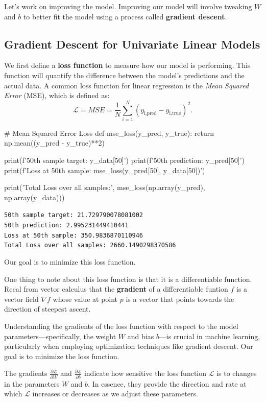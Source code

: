 Let's work on improving the model. Improving our model will involve tweaking $W$ and $b$ to better fit the model using a process called \textbf{gradient descent}.

\subsection{Gradient Descent for Univariate Linear Models}
\label{subsec:2}
We first define a \textbf{loss function} to measure how our model is performing. This function will quantify the difference between the model's predictions and the actual data. A common loss function for linear regression is the \textit{Mean Squared Error} (MSE), which is defined as:
$$\mathcal{L} = MSE = \frac{1}{N}\sum_{i=1}^N\left(y_\text{i,pred} - y_\text{i,true}\right)^2.$$

\begin{codeblock}

# Mean Squared Error Loss
def mse_loss(y_pred, y_true):
    return np.mean((y_pred - y_true)**2)

print(f'50th sample target: {y_data[50]}')
print(f'50th prediction: {y_pred[50]}')
print(f'Loss at 50th sample: {mse_loss(y_pred[50], y_data[50])}')

print('Total Loss over all samples:', mse_loss(np.array(y_pred), np.array(y_data)))
\end{codeblock}
\texttt{50th sample target: 21.729790078081002 \\
50th prediction: 2.995231449410441 \\
Loss at 50th sample: 350.9836870110946 \\
Total Loss over all samples: 2660.1490298370586 \\
}

Our goal is to minimize this loss function. 

One thing to note about this loss function is that it is a differentiable function. Recal from vector calculus that the \textbf{gradient} of a differentiable funtion $f$ is a vector field $\nabla f$ whose value at point $p$ is a vector that points towards the direction of steepest ascent. 

Understanding the gradients of the loss function with respect to the model parameters—specifically, the weight $W$ and bias $b$—is crucial in machine learning, particularly when employing optimization techniques like gradient descent. Our goal is to minimize the loss function. 

The gradients $\frac{\partial \mathcal{L}}{\partial W}$ and $\frac{\partial \mathcal{L}}{\partial b}$ indicate how sensitive the loss function $\mathcal{L}$ is to changes in the parameters $W$ and $b$. In essence, they provide the direction and rate at which $\mathcal{L}$ increases or decreases as we adjust these parameters.

